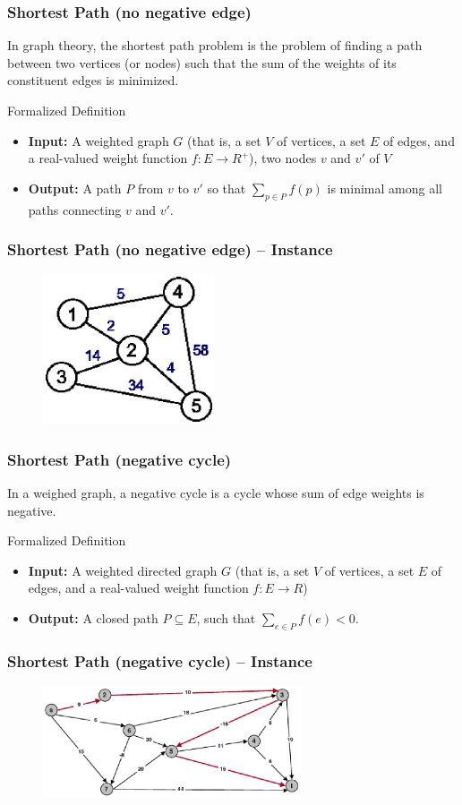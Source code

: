 \documentclass[slidestop,compress,mathserif]{beamer}
\begin{document}
\frame
{
  \frametitle{Shortest Path (no negative edge)}
  In graph theory, the shortest path problem is the problem of finding a path between two vertices (or nodes) such that the sum of the weights of its constituent edges is minimized. 
  \begin{block}{Formalized Definition}
  \begin{itemize}
  \item {\bf Input:} A weighted graph $G$ (that is, a set $V$ of vertices, a set $E$ of edges, and a real-valued weight function $f: E \rightarrow R^+$), two nodes $v$ and $v'$ of $V$
  \item {\bf Output:} A path $P$ from $v$ to $v'$ so that $\sum_{p \in P} f(p)$ is minimal among all paths connecting $v$ and $v'$.
  \end{itemize}
  \end{block}
}
\frame
{
  \frametitle{Shortest Path (no negative edge) -- Instance}
  \begin{figure}
  \includegraphics[width=2in]{wgraph.eps}
  \end{figure}
}
\frame
{
  \frametitle{Shortest Path (negative cycle)}
  In a weighed graph, a negative cycle is a cycle whose sum of edge weights is negative.
  \begin{block}{Formalized Definition}
  \begin{itemize}
  \item {\bf Input:} A weighted directed graph $G$ (that is, a set $V$ of vertices, a set $E$ of edges, and a real-valued weight function $f: E \rightarrow R$)
  \item {\bf Output:} A closed path $P \subseteq E$, such that $\sum_{e \in P}f(e) < 0$.
  \end{itemize}
  \end{block}
}
\frame
{
  \frametitle{Shortest Path (negative cycle) -- Instance}
  \begin{figure}
  \includegraphics[width=3in]{negpath.eps}
  \end{figure}
}
\end{document}

